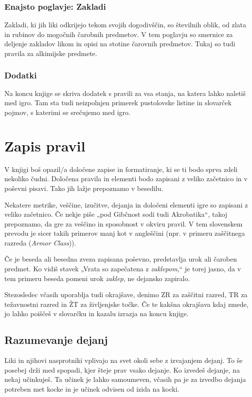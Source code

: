 \subsubsection{Enajsto poglavje: Zakladi}
Zakladi, ki jih liki odkrijejo tekom svojih dogodivščin, so številnih oblik, od zlata in rubinov do mogočnih čarobnih predmetov. V tem poglavju so smernice za deljenje zakladov likom in opisi na stotine čarovnih predmetov. Tukaj so tudi pravila za alkimijske predmete.

\subsubsection{Dodatki}
Na koncu knjige se skriva dodatek s pravili za vsa stanja, na katera lahko naletiš med igro. Tam sta tudi neizpolnjen primerek pustolovske listine in slovarček pojmov, s katerimi se srečujemo med igro.

\section{Zapis pravil}
V knjigi boš opazil/a določene zapise in formatiranje, ki se ti bodo sprva zdeli nekoliko čudni. Določena pravila in elementi bodo zapisani z veliko začetnico in v poševni pisavi. Tako jih lažje prepoznamo v besedilu.

Nekatere metrike, veščine, izučitve, dejanja in določeni elementi igre so zapisani z veliko začetnico. Če nekje piše „pod Gibčnost sodi tudi Akrobatika“, takoj prepoznamo, da gre za veščino in sposobnost v okviru pravil. V tem slovenskem prevodu je sicer takih primerov manj kot v angleščini (npr. v primeru zaščitnega razreda (\textit{Armor Class})).

Če je beseda ali besedna zveza zapisana poševno, predstavlja urok ali čaroben predmet. Ko vidiš stavek „Vrata so zapečatena z \textit{zaklepom},“ je torej jasno, da v tem primeru beseda pomeni urok \textit{zaklep}, ne dejansko zapiralo.

Stezosledec včasih uporablja tudi okrajšave, denimo ZR za zaščitni razred, TR za težavnostni razred in ŽT za življenjske točke. Če te kakšna okrajšava kdaj zmede, jo lahko poiščeš v slovarčku in kazalu izrazja na koncu knjige.

\subsection{Razumevanje dejanj}
Liki in njihovi nasprotniki vplivajo na svet okoli sebe z izvajanjem dejanj. To še posebej drži med spopadi, kjer šteje prav vsako dejanje. Ko izvedeš dejanje, na nekaj učinkuješ. Ta učinek je lahko samoumeven, včasih pa je za izvedbo dejanja potreben met kocke in je učinek odvisen od izida na kocki.

